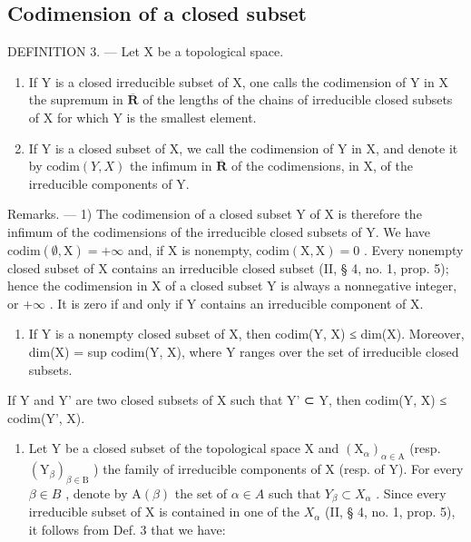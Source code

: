 \subsection{Codimension of a closed subset}

DEFINITION 3. --- Let X be a topological space.

\begin{enumerate}
\def\labelenumi{\alph{enumi})}
\item
  If Y is a closed irreducible subset of X, one calls the codimension of Y in X the supremum in \(\overline{\mathbf{R}}\) of the lengths of the chains of irreducible closed subsets of X for which Y is the smallest element.
\item
  If Y is a closed subset of X, we call the codimension of Y in X, and denote it by \(\text{codim}(Y, X)\) the infimum in \(\overline{\mathbf{R}}\) of the codimensions, in X, of the irreducible components of Y.
\end{enumerate}

Remarks. --- 1) The codimension of a closed subset Y of X is therefore the infimum of the codimensions of the irreducible closed subsets of Y. We have \(\mathrm{codim}(\emptyset, \mathrm{X}) = +\infty\) and, if X is nonempty, \(\mathrm{codim}(\mathrm{X}, \mathrm{X}) = 0\) . Every nonempty closed subset of X contains an irreducible closed subset (II, § 4, no. 1, prop. 5); hence the codimension in X of a closed subset Y is always a nonnegative integer, or \(+\infty\) . It is zero if and only if Y contains an irreducible component of X.

\begin{enumerate}
\def\labelenumi{\arabic{enumi})}
\setcounter{enumi}{1}
\tightlist
\item
  If Y is a nonempty closed subset of X, then codim(Y, X) ≤ dim(X). Moreover, dim(X) = sup codim(Y, X), where Y ranges over the set of irreducible closed subsets.
\end{enumerate}

If Y and Y' are two closed subsets of X such that Y' ⊂ Y, then codim(Y, X) ≤ codim(Y', X).

\begin{enumerate}
\def\labelenumi{\arabic{enumi})}
\setcounter{enumi}{2}
\tightlist
\item
  Let Y be a closed subset of the topological space X and \((\mathrm{X}_{\alpha})_{\alpha\in\mathrm{A}}\) (resp. \((\mathrm{Y}_{\beta})_{\beta\in\mathrm{B}}\) ) the family of irreducible components of X (resp. of Y). For every \(\beta\in B\) , denote by \(\mathrm{A}(\beta)\) the set of \(\alpha\in A\) such that \(Y_{\beta}\subset X_{\alpha}\) . Since every irreducible subset of X is contained in one of the \(X_{\alpha}\) (II, § 4, no. 1, prop. 5), it follows from Def. 3 that we have:
\end{enumerate}

